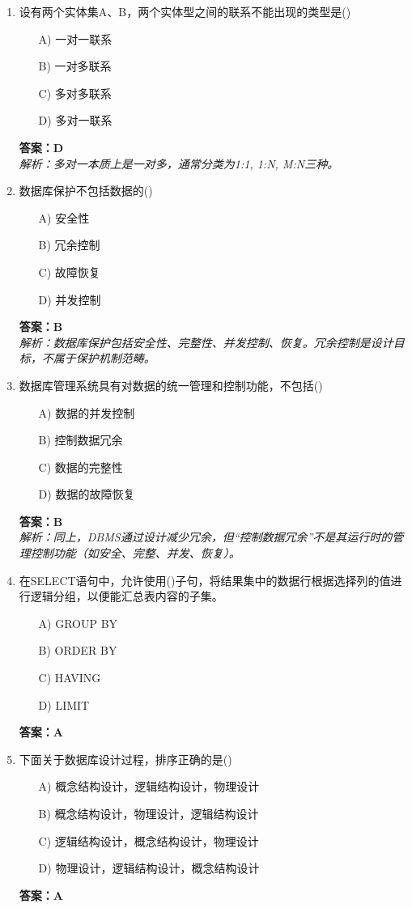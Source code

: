 \documentclass[a4paper,12pt]{article}
\begin{document}
\begin{enumerate}[label=\arabic*.]
\item 设有两个实体集A、B，两个实体型之间的联系不能出现的类型是()
\begin{itemize}
    \item[A)] 一对一联系
    \item[B)] 一对多联系
    \item[C)] 多对多联系
    \item[D)] 多对一联系
\end{itemize}
\textbf{答案：D} \\
\textit{解析：多对一本质上是一对多，通常分类为1:1, 1:N, M:N三种。}

\item 数据库保护不包括数据的()
\begin{itemize}
    \item[A)] 安全性
    \item[B)] 冗余控制
    \item[C)] 故障恢复
    \item[D)] 并发控制
\end{itemize}
\textbf{答案：B} \\
\textit{解析：数据库保护包括安全性、完整性、并发控制、恢复。冗余控制是设计目标，不属于保护机制范畴。}

\item 数据库管理系统具有对数据的统一管理和控制功能，不包括()
\begin{itemize}
    \item[A)] 数据的并发控制
    \item[B)] 控制数据冗余
    \item[C)] 数据的完整性
    \item[D)] 数据的故障恢复
\end{itemize}
\textbf{答案：B} \\
\textit{解析：同上，DBMS通过设计减少冗余，但“控制数据冗余”不是其运行时的管理控制功能（如安全、完整、并发、恢复）。}

\item 在SELECT语句中，允许使用()子句，将结果集中的数据行根据选择列的值进行逻辑分组，以便能汇总表内容的子集。
\begin{itemize}
    \item[A)] GROUP BY
    \item[B)] ORDER BY
    \item[C)] HAVING
    \item[D)] LIMIT
\end{itemize}
\textbf{答案：A}

\item 下面关于数据库设计过程，排序正确的是()
\begin{itemize}
    \item[A)] 概念结构设计，逻辑结构设计，物理设计
    \item[B)] 概念结构设计，物理设计，逻辑结构设计
    \item[C)] 逻辑结构设计，概念结构设计，物理设计
    \item[D)] 物理设计，逻辑结构设计，概念结构设计
\end{itemize}
\textbf{答案：A}


\end{enumerate}
\end{document}
